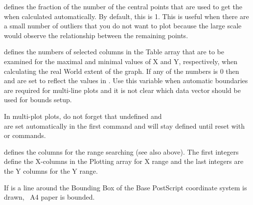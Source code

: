 {   
   defines the fraction of the number of the central points that are
   used to get the  when calculated automatically.
   By default, this is 1. This is useful when there are a small number
   of outliers that you do not want to plot because the large scale
   would observe the relationship between the remaining points.

   defines the numbers of selected columns in the Table array that 
   are to be examined for the maximal and minimal values of X and Y, 
   respectively, when calculating the real World extent of the graph. 
   If any of the numbers is 0 then  and 
   are set to reflect the values in .
   Use this variable when automatic boundaries are required
   for multi-line plots and it is not clear which data vector should
   be used for bounds setup.

   In multi-plot plots, do not forget that undefined 
   and \\
    are set automatically in the first  
   command and will stay defined until reset with  or 
   commands.

   defines the columns for the range searching (see also above).
   The first  integers define the X-columns 
   in the Plotting
   array for X range and the last  integers are the 
   Y columns for the Y range.

   If  is  a line around the Bounding Box of the 
   Base PostScript coordinate system is drawn, \ie\ A4 paper is bounded.
}   




